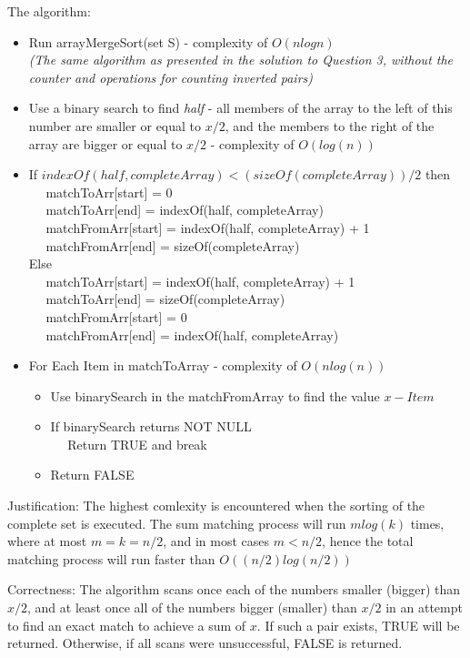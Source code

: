 \documentclass{article}
\begin{document}
The algorithm:
\begin{itemize}
  \item Run arrayMergeSort(set S) - complexity of $O(n log{n})$\\
  \textit{(The same algorithm as presented in the solution to Question 3, without the counter and operations for counting
  inverted pairs)}
  \item Use a binary search to find \textit{half} - all members of the
  array to the left of this number are smaller or equal to $x/2$, and the
  members to the right of the array are bigger or equal to $x/2$ - complexity of
  $O(log(n))$
  \item If $indexOf(half, completeArray) < (sizeOf(completeArray))/2$ then\\
  $\quad$ matchToArr[start] = 0\\
  $\quad$ matchToArr[end] = indexOf(half, completeArray)\\
  $\quad$ matchFromArr[start] = indexOf(half, completeArray) + 1\\
  $\quad$ matchFromArr[end] =   sizeOf(completeArray)\\
  Else\\
  $\quad$ matchToArr[start] = indexOf(half, completeArray) + 1\\
  $\quad$ matchToArr[end] =   sizeOf(completeArray)\\
  $\quad$ matchFromArr[start] = 0\\
  $\quad$ matchFromArr[end] = indexOf(half, completeArray)\\
  \item For Each Item in matchToArray - complexity of $O(n log(n))$
  \begin{itemize}
    \item Use binarySearch in the matchFromArray to find the value $x - Item$
    \item If binarySearch returns NOT NULL\\
    $\quad$ Return TRUE and break   
    \item Return FALSE
  \end{itemize} 
\end{itemize}

Justification: The highest comlexity is encountered when the sorting of the
complete set is executed. The sum  matching process will run $m log(k)$ times, where at most $m
= k = n/2$, and in most cases $m < n/2$, hence the total matching process will
run faster than $O((n/2) log (n/2))$

Correctness: The algorithm scans once each of the numbers smaller (bigger) than
$x/2$, and at least once all of the numbers bigger (smaller) than $x/2$ in an
attempt to find an exact match to achieve a sum of $x$. If such a pair exists,
TRUE will be returned. Otherwise, if all scans were unsuccessful, FALSE is
returned.
\end{document}
